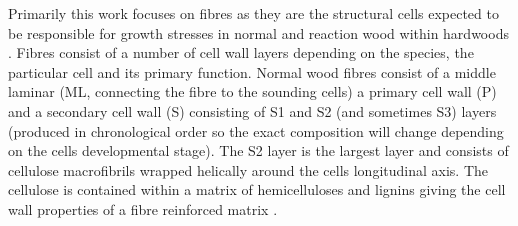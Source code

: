 Primarily this work focuses on fibres as they are the structural cells expected
to be responsible for growth stresses in normal and reaction wood within
hardwoods \cite{archer1987growth}. Fibres consist of a number of cell wall layers depending on
the species, the particular cell and its primary function. Normal wood fibres
consist of a middle laminar (ML, connecting the fibre to
the sounding cells) a primary cell wall (P) and a secondary cell wall (S) consisting of
S1 and S2 (and sometimes S3) layers (produced in chronological order so the exact composition
will change depending on the cells developmental stage)\cite{barnett1981xylem}. The S2 layer is
the largest layer and consists of cellulose macrofibrils wrapped helically
around the cells longitudinal axis. The cellulose is contained within a
matrix of hemicelluloses and lignins giving the cell wall properties
of a fibre reinforced matrix \cite{niklas2012plant}.